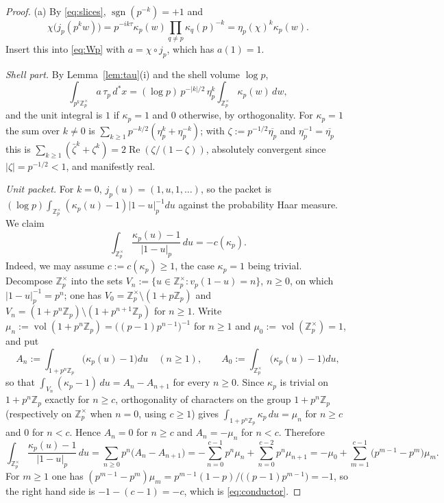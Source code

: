 \documentclass[11pt]{amsart}
\theoremstyle{definition}
\theoremstyle{remark}
\newcommand{\Z}{\mathbb Z}
\newcommand{\dstar}{\,d^{*}}
\newcommand{\Rel}{\operatorname{Re}}
\newcommand{\vol}{\operatorname{vol}}
\newcommand{\sgn}{\operatorname{sgn}}
\begin{document}
\begin{proof}
(a)  By \eqref{eq:slices}, $\sgn(p^{-k})=+1$ and
\[
\chi\bigl(j_p(p^{k}w)\bigr)=p^{-ik\tau}\kappa_p(w)\prod_{q\ne p}\kappa_q(p)^{-k}
=\eta_p(\chi)^{k}\kappa_p(w).
\]
Insert this into \eqref{eq:Wp} with $a=\chi\circ j_p$, which has $a(1)=1$.

\emph{Shell part.}  By Lemma~\ref{lem:tau}(i) and the shell volume $\log p$,
\[
\int_{p^{k}\Z_p^{\times}}a\,\tau_p\dstar x
=(\log p)\,p^{-|k|/2}\,\eta_p^{k}\int_{\Z_p^{\times}}\kappa_p(w)\,dw ,
\]
and the unit integral is $1$ if $\kappa_p=1$ and $0$ otherwise, by
orthogonality.  For $\kappa_p=1$ the sum over
$k\ne0$ is $\sum_{k\ge1}p^{-k/2}(\eta_p^{k}+\eta_p^{-k})$; with
$\zeta:=p^{-1/2}\overline{\eta_p}$ and $\eta_p^{-1}=\overline{\eta_p}$ this is
$\sum_{k\ge1}(\bar\zeta^{k}+\zeta^{k})=2\Rel(\zeta/(1-\zeta))$, absolutely
convergent since $|\zeta|=p^{-1/2}<1$, and manifestly real.

\emph{Unit packet.}  For $k=0$, $j_p(u)=(1,u,1,\dots)$, so the packet is
$(\log p)\int_{\Z_p^{\times}}(\kappa_p(u)-1)|1-u|_p^{-1}du$ against the
probability Haar measure.  We claim
\begin{equation}\label{eq:conductor}
\int_{\Z_p^{\times}}\frac{\kappa_p(u)-1}{|1-u|_p}\,du=-c(\kappa_p).
\end{equation}
Indeed, we may assume $c:=c(\kappa_p)\ge1$, the case $\kappa_p=1$ being
trivial.  Decompose $\Z_p^{\times}$ into the sets
$V_n:=\{u\in\Z_p^{\times}:v_p(1-u)=n\}$, $n\ge0$, on which $|1-u|_p^{-1}=p^{n}$;
one has $V_0=\Z_p^{\times}\setminus(1+p\Z_p)$ and
$V_n=(1+p^{n}\Z_p)\setminus(1+p^{n+1}\Z_p)$ for $n\ge1$.  Write
$\mu_n:=\vol(1+p^{n}\Z_p)=\bigl((p-1)p^{n-1}\bigr)^{-1}$ for $n\ge1$ and
$\mu_0:=\vol(\Z_p^{\times})=1$, and put
\[
A_n:=\int_{1+p^{n}\Z_p}\bigl(\kappa_p(u)-1\bigr)du\quad(n\ge1),\qquad
A_0:=\int_{\Z_p^{\times}}\bigl(\kappa_p(u)-1\bigr)du,
\]
so that $\int_{V_n}(\kappa_p-1)\,du=A_n-A_{n+1}$ for every $n\ge0$.  Since
$\kappa_p$ is trivial on $1+p^{n}\Z_p$ exactly for $n\ge c$, orthogonality of
characters on the group $1+p^{n}\Z_p$ (respectively on $\Z_p^{\times}$ when
$n=0$, using $c\ge1$) gives $\int_{1+p^n\Z_p}\kappa_p\,du=\mu_n$ for $n\ge c$
and $0$ for $n<c$.  Hence $A_n=0$ for $n\ge c$ and $A_n=-\mu_n$ for $n<c$.
Therefore
\[
\int_{\Z_p^{\times}}\frac{\kappa_p(u)-1}{|1-u|_p}\,du
=\sum_{n\ge0}p^{n}\bigl(A_n-A_{n+1}\bigr)
=-\sum_{n=0}^{c-1}p^{n}\mu_n+\sum_{n=0}^{c-2}p^{n}\mu_{n+1}
=-\mu_0+\sum_{m=1}^{c-1}\bigl(p^{m-1}-p^{m}\bigr)\mu_m .
\]
For $m\ge1$ one has $(p^{m-1}-p^{m})\mu_m=p^{m-1}(1-p)/\bigl((p-1)p^{m-1}\bigr)
=-1$, so the right hand side is $-1-(c-1)=-c$, which is \eqref{eq:conductor}.


\end{proof}
\end{document}
